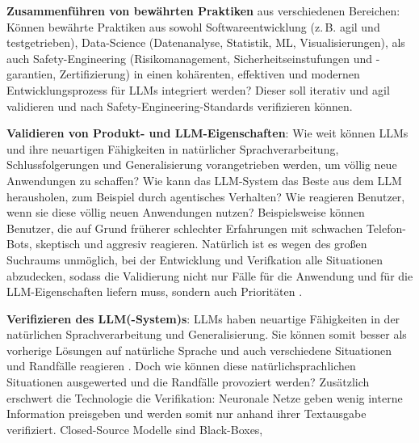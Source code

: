 \documentclass[twocolumn]{article}
\begin{document}
\begin{compactenum}
\item \textbf{Zusammenführen von bewährten Praktiken} aus verschiedenen Bereichen:
  Können bewährte Praktiken aus sowohl Softwareentwicklung (z.\,B. agil und testgetrieben),
  Data-Science (Datenanalyse, Statistik, ML, Visualisierungen),
  als auch Safety-Engineering (Risikomanagement, Sicherheitseinstufungen und -garantien, Zertifizierung)
  in einen kohärenten, effektiven und modernen Entwicklungsprozess für LLMs integriert werden?
  Dieser soll iterativ und agil validieren und nach Safety-Engineering-Standards verifizieren können.
\item \textbf{Validieren von Produkt- und LLM-Eigenschaften}: Wie weit können LLMs und ihre neuartigen Fähigkeiten in natürlicher Sprachverarbeitung, Schlussfolgerungen und Generalisierung vorangetrieben werden, um völlig neue Anwendungen zu schaffen?
  Wie kann das LLM-System das Beste aus dem LLM herausholen, zum Beispiel durch agentisches Verhalten?
  Wie reagieren Benutzer, wenn sie diese völlig neuen Anwendungen nutzen? Beispielsweise können Benutzer,
  die auf Grund früherer schlechter Erfahrungen mit schwachen Telefon-Bots, skeptisch und aggresiv reagieren.
  Natürlich ist es wegen des großen Suchraums unmöglich, bei der Entwicklung und Verifkation alle Situationen abzudecken,
  sodass die Validierung nicht nur Fälle für die Anwendung und für die LLM-Eigenschaften liefern muss,
  sondern auch Prioritäten \cite{Röttger24}.
\item \textbf{Verifizieren des LLM(-System)s}: LLMs haben neuartige Fähigkeiten in der natürlichen Sprachverarbeitung und Generalisierung.
  Sie können somit besser als vorherige Lösungen auf natürliche Sprache und auch verschiedene Situationen und Randfälle reagieren \cite{Brown20}.
  Doch wie können diese natürlichsprachlichen Situationen ausgewerted und die Randfälle provoziert werden?
  Zusätzlich erschwert die Technologie die Verifikation: Neuronale Netze geben wenig interne Information preisgeben \cite{Chang24}
  und werden somit nur anhand ihrer Textausgabe verifiziert. Closed-Source Modelle sind Black-Boxes,

\end{compactenum}
\end{document}
